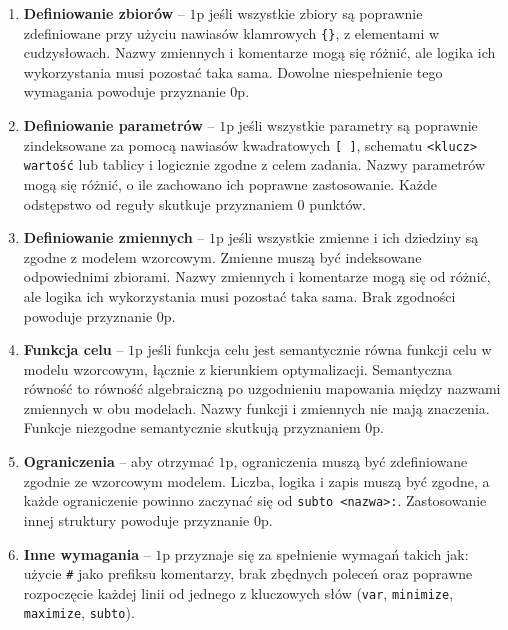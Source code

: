 \begin{enumerate}
\item \textbf{Definiowanie zbiorów} -- $1$p jeśli wszystkie zbiory są poprawnie zdefiniowane przy użyciu nawiasów klamrowych \texttt{\{\}}, z elementami w cudzysłowach. Nazwy zmiennych i komentarze mogą się różnić, ale logika ich wykorzystania musi pozostać taka sama. Dowolne niespełnienie tego wymagania powoduje przyznanie $0$p. %
\item \textbf{Definiowanie parametrów} -- $1$p jeśli wszystkie parametry są poprawnie zindeksowane za pomocą nawiasów kwadratowych \texttt{[ ]}, schematu \texttt{<klucz> wartość} lub tablicy i logicznie zgodne z celem zadania. Nazwy parametrów mogą się różnić, o ile zachowano ich poprawne zastosowanie. Każde odstępstwo od reguły skutkuje przyznaniem $0$ punktów.
\item \textbf{Definiowanie zmiennych} -- $1$p jeśli wszystkie zmienne i ich dziedziny są zgodne z modelem wzorcowym. Zmienne muszą być indeksowane odpowiednimi zbiorami. Nazwy zmiennych i komentarze mogą się od różnić, ale logika ich wykorzystania musi pozostać taka sama. Brak zgodności powoduje przyznanie $0$p.
\item \textbf{Funkcja celu} -- $1$p jeśli funkcja celu jest semantycznie równa funkcji celu w modelu wzorcowym, łącznie z kierunkiem optymalizacji. Semantyczna równość to równość algebraiczną po uzgodnieniu mapowania między nazwami zmiennych w obu modelach. Nazwy funkcji i zmiennych nie mają znaczenia. Funkcje niezgodne semantycznie skutkują przyznaniem $0$p.
\item \textbf{Ograniczenia} -- aby otrzymać $1$p, ograniczenia muszą być zdefiniowane zgodnie ze wzorcowym modelem. Liczba, logika i zapis muszą być zgodne, a każde ograniczenie powinno zaczynać się od \texttt{subto <nazwa>:}. Zastosowanie innej struktury powoduje przyznanie $0$p.
\item \textbf{Inne wymagania} -- $1$p przyznaje się za spełnienie wymagań takich jak: użycie \texttt{\#} jako prefiksu komentarzy, brak zbędnych poleceń oraz poprawne rozpoczęcie każdej linii od jednego z kluczowych słów (\texttt{var}, \texttt{minimize}, \texttt{maximize}, \texttt{subto}). 
\end{enumerate}


